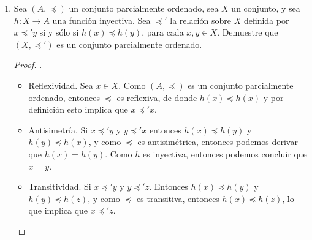 \documentclass[letterpaper,11pt]{article}
\begin{document}
\begin{enumerate}
    \item Sea $(A, \preceq)$ un conjunto parcialmente ordenado, sea $X$ un 
    conjunto, y sea $h: X → A$ una función inyectiva. Sea $\preceq'$ la 
    relación sobre $X$ definida por $x \preceq' y$ si y sólo si $h(x) 
    \preceq h(y)$, para cada $x, y \in X$. Demuestre que $(X, \preceq')$ es 
    un conjunto parcialmente ordenado.

    \begin{proof} .
        \begin{itemize}
            \item Reflexividad. Sea $x ∈ X$. Como $(A, \preceq)$ es un conjunto
            parcialmente ordenado, entonces $\preceq$ es reflexiva, de donde 
            $h(x) \preceq h(x)$ y por definición esto implica que $x \preceq' x$.

            \item Antisimetría. Si $x \preceq' y$ y $y \preceq' x$ entonces 
            $h(x) \preceq h(y)$ y $h(y) \preceq h(x)$, y como $\preceq$ es 
            antisimétrica, entonces podemos derivar que $h(x) = h(y)$. Como 
            $h$ es inyectiva, entonces podemos concluir que $x = y$.

            \item Transitividad. Si $x \preceq' y$ y $y \preceq' z$. Entonces 
            $h(x) \preceq h(y)$ y $h(y) \preceq h(z)$, y como $\preceq$ es 
            transitiva, entonces $h(x) \preceq h(z)$, lo que implica que 
            $x \preceq' z$.
        \end{itemize}
    \end{proof}
\end{enumerate}
\end{document}
